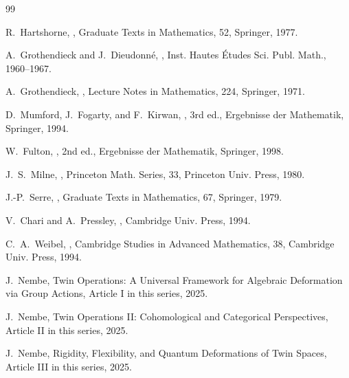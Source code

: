 \documentclass[11pt,a4paper]{article}
\numberwithin{equation}{section}
\begin{document}
	\begin{thebibliography}{99}
		
		R.~Hartshorne,
		,
		\newblock Graduate Texts in Mathematics, 52, Springer, 1977.
		
		A.~Grothendieck and J.~Dieudonn\'e,
		,
		\newblock Inst. Hautes \'Etudes Sci. Publ. Math., 1960--1967.
		
		A.~Grothendieck,
		,
		\newblock Lecture Notes in Mathematics, 224, Springer, 1971.
		
		D.~Mumford, J.~Fogarty, and F.~Kirwan,
		,
		\newblock 3rd ed., Ergebnisse der Mathematik, Springer, 1994.
		
		W.~Fulton,
		,
		\newblock 2nd ed., Ergebnisse der Mathematik, Springer, 1998.
		
		J.~S.~Milne,
		,
		\newblock Princeton Math. Series, 33, Princeton Univ. Press, 1980.
		
		J.-P.~Serre,
		,
		\newblock Graduate Texts in Mathematics, 67, Springer, 1979.
		
		V.~Chari and A.~Pressley,
		,
		\newblock Cambridge Univ. Press, 1994.
		
		C.~A.~Weibel,
		,
		\newblock Cambridge Studies in Advanced Mathematics, 38, Cambridge Univ. Press, 1994.
		
		J.~Nembe,
		\newblock Twin Operations: A Universal Framework for Algebraic Deformation via Group Actions,
		\newblock Article I in this series, 2025.
		
		J.~Nembe,
		\newblock Twin Operations II: Cohomological and Categorical Perspectives,
		\newblock Article II in this series, 2025.
		
		J.~Nembe,
		\newblock Rigidity, Flexibility, and Quantum Deformations of Twin Spaces,
		\newblock Article III in this series, 2025.
		
	\end{thebibliography}
	
\end{document}
